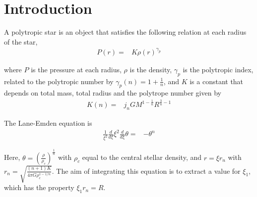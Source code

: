 \documentclass[linenumbers,trackchanges]{aastex701}
\begin{document}

\section{Introduction} 

A polytropic star is an object that satisfies the following relation at each radius of the star,
\begin{align}
    P(r)=&K\rho(r)^{\gamma_p}
\end{align}

where $P$ is the pressure at each radius, $\rho$ is the density, $\gamma_p$ is the polytropic index, related to the polytropic number by $\gamma_p(n)=1+\frac{1}{n}$, and $K$ is a constant that depends on total mass, total radius and the polytrope number given by
\begin{align}
    K(n)=&j_nGM^{1-\frac{1}{n}}R^{\frac{3}{n}-1}
\end{align}

The Lane-Emden equation is
\begin{align}
    \frac{1}{\xi^2}\frac{d}{d\xi}\xi^2\frac{d}{d\xi}\theta=&-\theta^n
\end{align}

Here, $\theta=\left(\frac{\rho}{\rho_c}\right)^{\frac{1}{n}}$ with $\rho_c$ equal to the central stellar density, and $r=\xi r_n$ with $r_n=\sqrt{\frac{(n+1)K}{4\pi G\rho_c^{1-1/n}}}$. The aim of integrating this equation is to extract a value for $\xi_1$, which has the property $\xi_1r_n=R$.
\end{document}
